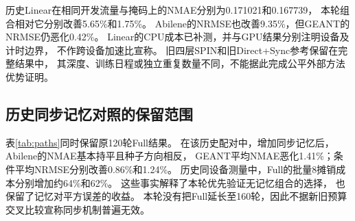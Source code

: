 历史Linear在相同开发流量与掩码上的NMAE分别为0.171021和0.167739，
本轮组合相对它分别改善5.65\%和1.75\%。
Abilene的NRMSE也改善9.35\%，但GEANT的NRMSE仍恶化0.42\%。
Linear的CPU成本已补测，并与GPU结果分别注明设备及计时边界，
不作跨设备加速比宣称。
旧四层SPIN和旧Direct+Sync参考保留在完整结果中，
其深度、训练日程或独立重复数量不同，不能据此完成公平外部方法优势证明。

\subsection{历史同步记忆对照的保留范围}
表\ref{tab:paths}同时保留原120轮Full结果。
在该历史配对中，增加同步记忆后，Abilene的NMAE基本持平且种子方向相反，
GEANT平均NMAE恶化1.41\%；条件平均NRMSE分别改善0.86\%和1.24\%。
历史同设备测量中，Full的批量8摊销成本分别增加约64\%和62\%。
这些事实解释了本轮优先验证无记忆组合的选择，
也保留了记忆对平方误差的收益。
本轮没有把Full延长至160轮，因此不据新旧预算交叉比较宣称同步机制普遍无效。
